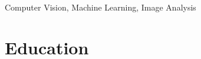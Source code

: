 \documentclass[line,margin]{res}
\begin{document}
\begin{resume}

%
%
\section{}       

Computer Vision, Machine Learning, Image Analysis  %



\section{\sc Education}
\smallskip


\end{resume}
\end{document}
